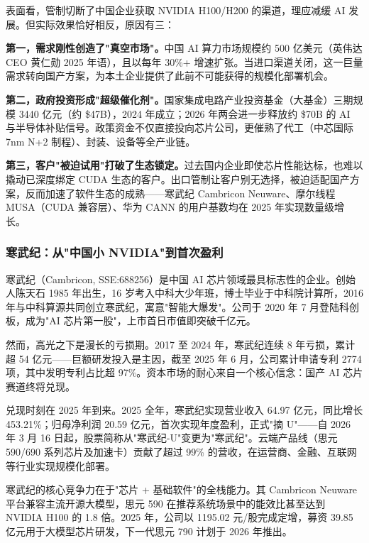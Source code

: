 \begin{whybox}[为什么出口管制反而加速了国产替代？]
表面看，管制切断了中国企业获取 NVIDIA H100/H200 的渠道，理应减缓 AI 发展。但实际效果恰好相反，原因有三：

\textbf{第一，需求刚性创造了"真空市场"。}中国 AI 算力市场规模约 500 亿美元（英伟达 CEO 黄仁勋 2025 年语），且以每年 30\%+ 增速扩张。当进口渠道关闭，这一巨量需求转向国产方案，为本土企业提供了此前不可能获得的规模化部署机会。

\textbf{第二，政府投资形成"超级催化剂"。}国家集成电路产业投资基金（大基金）三期规模 3440 亿元（约 \$47B），2024 年成立；2026 年两会进一步释放约 \$70B 的 AI 与半导体补贴信号。政策资金不仅直接投向芯片公司，更催熟了代工（中芯国际 7nm N+2 制程）、封装、设备等全产业链。

\textbf{第三，客户"被迫试用"打破了生态锁定。}过去国内企业即使芯片性能达标，也难以撬动已深度绑定 CUDA 生态的客户。出口管制让客户别无选择，被迫适配国产方案，反而加速了软件生态的成熟——寒武纪 Cambricon Neuware、摩尔线程 MUSA（CUDA 兼容层）、华为 CANN 的用户基数均在 2025 年实现数量级增长。
\end{whybox}


\subsubsection{寒武纪：从"中国小 NVIDIA"到首次盈利}

寒武纪（Cambricon, SSE:688256）是中国 AI 芯片领域最具标志性的企业。创始人陈天石 1985 年出生，16 岁考入中科大少年班，博士毕业于中科院计算所，2016 年与中科算源共同创立寒武纪，寓意"智能大爆发"。公司于 2020 年 7 月登陆科创板，成为"AI 芯片第一股"，上市首日市值即突破千亿元。

然而，高光之下是漫长的亏损期。2017 至 2024 年，寒武纪连续 8 年亏损，累计超 54 亿元——巨额研发投入是主因，截至 2025 年 6 月，公司累计申请专利 2774 项，其中发明专利占比超 97\%。资本市场的耐心来自一个核心信念：国产 AI 芯片赛道终将兑现。

兑现时刻在 2025 年到来。2025 全年，寒武纪实现营业收入 64.97 亿元，同比增长 453.21\%；归母净利润 20.59 亿元，首次实现年度盈利，正式"摘 U"——自 2026 年 3 月 16 日起，股票简称从"寒武纪-U"变更为"寒武纪"。云端产品线（思元 590/690 系列芯片及加速卡）贡献了超过 99\% 的营收，在运营商、金融、互联网等行业实现规模化部署。

寒武纪的核心竞争力在于"芯片 + 基础软件"的全栈能力。其 Cambricon Neuware 平台兼容主流开源大模型，思元 590 在推荐系统场景中的能效比甚至达到 NVIDIA H100 的 1.8 倍。2025 年，公司以 1195.02 元/股完成定增，募资 39.85 亿元用于大模型芯片研发，下一代思元 790 计划于 2026 年推出。


